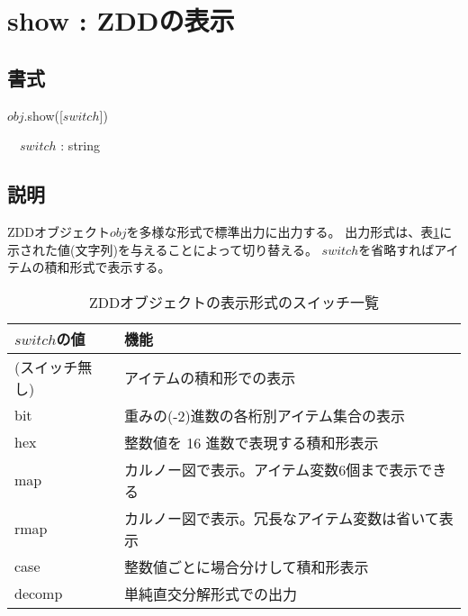 
\section{show : ZDDの表示\label{sect:show}}
\subsection*{書式}
$obj$.show([$switch$])

~~$switch$ : string

\subsection*{説明}
ZDDオブジェクト$obj$を多様な形式で標準出力に出力する。
出力形式は、表\ref{tbl:zdd_show_switch}に示された値(文字列)を与えることによって切り替える。
$switch$を省略すればアイテムの積和形式で表示する。


\begin{table}[htbp]
\begin{center}
\caption{ZDDオブジェクトの表示形式のスイッチ一覧\label{tbl:zdd_show_switch}}
{\small
\begin{tabular}{l|l}
\hline
$switch$の値  & 機能 \\
\hline
 (スイッチ無し)	& アイテムの積和形での表示 \\
  bit					& 重みの(-2)進数の各桁別アイテム集合の表示 \\
  hex					& 整数値を 16 進数で表現する積和形表示 \\
  map					& カルノー図で表示。アイテム変数6個まで表示できる \\
  rmap				& カルノー図で表示。冗長なアイテム変数は省いて表示  \\
  case				& 整数値ごとに場合分けして積和形表示 \\
  decomp			& 単純直交分解形式での出力 \\
\hline
\end{tabular}
}
\end{center}
\end{table}

